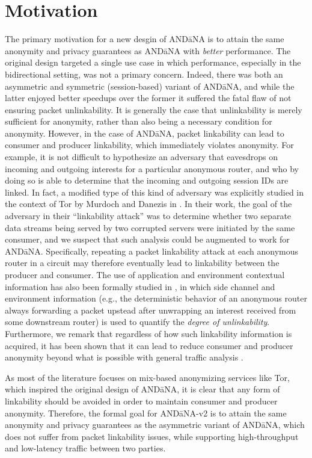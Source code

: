 \documentclass[10pt]{article}
\begin{document}
\section{Motivation}
The primary motivation for a new desgin of {\sf AND\=aNA} is to attain the same anonymity and privacy guarantees as {\sf AND\=aNA} with \emph{better} performance. The original design targeted a single use case in which performance, especially in the bidirectional setting, was not a primary concern. Indeed, there was both an asymmetric and symmetric (session-based) variant of {\sf AND\=aNA}, and while the latter enjoyed better speedups over the former it suffered the fatal flaw of not ensuring packet unlinkability. It is generally the case that unlinkability is merely sufficient for anonymity, rather than also being a necessary condition for anonymity. However, in the case of {\sf AND\=aNA}, packet linkability can lead to consumer and producer linkability, which immediately violates anonymity. For example, it is not difficult to hypothesize an adversary that eavesdrops on incoming and outgoing interests for a particular anonymous router, and who by doing so is able to determine that the incoming and outgoing session IDs are linked. In fact, a modified type of this kind of adversary was explicitly studied in the context of Tor by Murdoch and Danezis in \cite{tor-traffic-analysis}. In their work, the goal of the adversary in their ``linkability attack'' was to determine whether two separate data streams being served by two corrupted servers were initiated by the same consumer, and we suspect that such analysis could be augmented to work for {\sf AND\=aNA}. Specifically, repeating a packet linkability attack at each anonymous router in a circuit may therefore eventually lead to linkability between the producer and consumer. The use of application and environment contextual information has also been formally studied in \cite{attacking-unlinkability}, in which side channel and environment information (e.g., the deterministic behavior of an anonymous router always forwarding a packet upstead after unwrapping an interest received from some downstream router) is used to quantify the \emph{degree of unlinkability}. Furthermore, we remark that regardless of how such linkability information is acquired, it has been shown that it can lead to reduce consumer and producer anonymity beyond what is possible with general traffic analysis \cite{linkability-attacks}. 

As most of the literature focuses on mix-based anonymizing services like Tor, which inspired the original design of {\sf AND\=aNA}, it is clear that any form of linkability should be avoided in order to maintain consumer and producer anonymity. Therefore, the formal goal for {\sf AND\=aNA-v2} is to attain the same anonymity and privacy guarantees as the asymmetric variant of {\sf AND\=aNA}, which does not suffer from packet linkability issues, while supporting high-throughput and low-latency traffic between two parties. 
\end{document}
